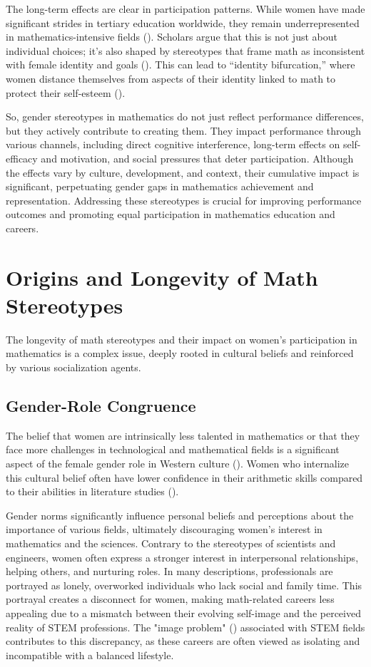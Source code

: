The long-term effects are clear in participation patterns. While women have made significant strides in tertiary education worldwide, they remain underrepresented in mathematics-intensive fields (\cite{OWID2024,Boeren2011}). Scholars argue that this is not just about individual choices; it's also shaped by stereotypes that frame math as inconsistent with female identity and goals (\cite{eccles1989,Gilligan1993,Monteiro2023}). This can lead to “identity bifurcation,” where women distance themselves from aspects of their identity linked to math to protect their self-esteem (\cite{pro,CROCKER199989}).

So, gender stereotypes in mathematics do not just reflect performance differences, but they actively contribute to creating them. They impact performance through various channels, including direct cognitive interference, long-term effects on self-efficacy and motivation, and social pressures that deter participation. Although the effects vary by culture, development, and context, their cumulative impact is significant, perpetuating gender gaps in mathematics achievement and representation. Addressing these stereotypes is crucial for improving performance outcomes and promoting equal participation in mathematics education and careers.



\section{Origins and Longevity of Math Stereotypes}
The longevity of math stereotypes and their impact on women's participation in mathematics is a complex issue, deeply rooted in cultural beliefs and reinforced by various socialization agents.
\subsection{Gender-Role Congruence}
The belief that women are intrinsically less talented in mathematics or that they face more challenges in technological and mathematical fields is a significant aspect of the female gender role in Western culture (\cite{Tsui2007}). Women who internalize this cultural belief often have lower confidence in their arithmetic skills compared to their abilities in literature studies (\cite{Plante2009}).

Gender norms significantly influence personal beliefs and perceptions about the importance of various fields, ultimately discouraging women's interest in mathematics and the sciences. Contrary to the stereotypes of scientists and engineers, women often express a stronger interest in interpersonal relationships, helping others, and nurturing roles. In many descriptions, professionals are portrayed as lonely, overworked individuals who lack social and family time. This portrayal creates a disconnect for women, making math-related careers less appealing due to a mismatch between their evolving self-image and the perceived reality of STEM professions. The "image problem" (\cite{eccles1989}) associated with STEM fields contributes to this discrepancy, as these careers are often viewed as isolating and incompatible with a balanced lifestyle.

